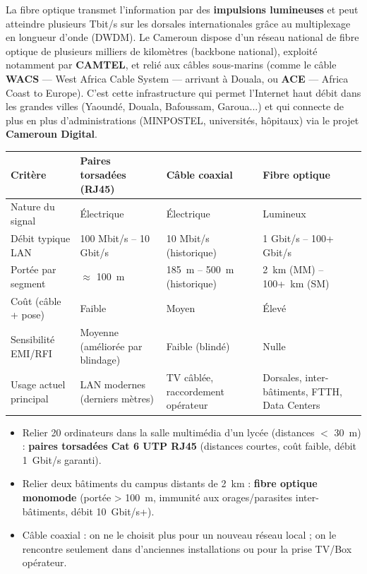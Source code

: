 \documentclass[11pt]{article}
\newcounter{popsec}
\newcounter{popsub}
\newcommand{\courssub}[1]{%
  \stepcounter{popsub}%
  \par\vspace{9pt}\noindent{\popxbold\fontsize{11.5}{13}\selectfont\color{popink}{\color{poporange}\thepopsec.\thepopsub}\hspace{6pt}#1}\par\nopagebreak\vspace{4pt}
}
\begin{document}
\begin{savaistu}
La fibre optique transmet l'information par des \textbf{impulsions lumineuses} et peut atteindre plusieurs Tbit/s sur les dorsales internationales grâce au multiplexage en longueur d'onde (DWDM). Le Cameroun dispose d'un réseau national de fibre optique de plusieurs milliers de kilomètres (backbone national), exploité notamment par \textbf{CAMTEL}, et relié aux câbles sous-marins (comme le câble \textbf{WACS} — West Africa Cable System — arrivant à Douala, ou \textbf{ACE} — Africa Coast to Europe). C'est cette infrastructure qui permet l'Internet haut débit dans les grandes villes (Yaoundé, Douala, Bafoussam, Garoua...) et qui connecte de plus en plus d'administrations (MINPOSTEL, universités, hôpitaux) via le projet \textbf{Cameroun Digital}.
\end{savaistu}

\courssub{Comparaison des trois supports}

\begin{center}
\begin{tabularx}{\linewidth}{|l|X|X|X|}
\hline
\rowcolor{popblue!40} \textbf{Critère} & \textbf{Paires torsadées (RJ45)} & \textbf{Câble coaxial} & \textbf{Fibre optique} \\
\hline
Nature du signal & Électrique & Électrique & Lumineux \\
\hline
Débit typique LAN & 100 Mbit/s -- 10 Gbit/s & 10 Mbit/s (historique) & 1 Gbit/s -- 100+ Gbit/s \\
\hline
Portée par segment & $\approx$ \SI{100}{m} & \SI{185}{m} -- \SI{500}{m} (historique) & \SI{2}{km} (MM) -- \SI{100+}{km} (SM) \\
\hline
Coût (câble + pose) & Faible & Moyen & Élevé \\
\hline
Sensibilité EMI/RFI & Moyenne (améliorée par blindage) & Faible (blindé) & Nulle \\
\hline
Usage actuel principal & LAN modernes (derniers mètres) & TV câblée, raccordement opérateur & Dorsales, inter-bâtiments, FTTH, Data Centers \\
\hline
\end{tabularx}
\end{center}

\begin{exemplebox}
\begin{itemize}
\item Relier 20 ordinateurs dans la salle multimédia d'un lycée (distances $<$ \SI{30}{m}) : \textbf{paires torsadées Cat 6 UTP RJ45} (distances courtes, coût faible, débit \SI{1}{Gbit/s} garanti).
\item Relier deux bâtiments du campus distants de \SI{2}{km} : \textbf{fibre optique monomode} (portée \textgreater{} \SI{100}{m}, immunité aux orages/parasites inter-bâtiments, débit \SI{10}{Gbit/s}+).
\item Câble coaxial : on ne le choisit plus pour un nouveau réseau local ; on le rencontre seulement dans d'anciennes installations ou pour la prise TV/Box opérateur.
\end{itemize}
\end{exemplebox}
\end{document}

